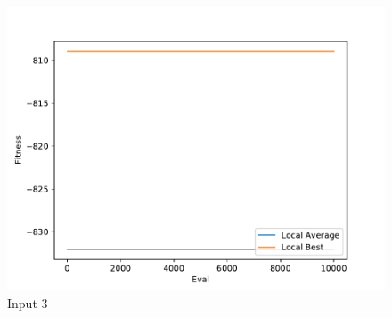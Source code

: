 \documentclass{standalone}
\begin{document}
\begin{figure}[!htb]
	\caption{Input 3}
	\label{fig:graph_3062}
	\includegraphics[width=\textwidth]{../graphs/graphs/3062.pdf}
\end{figure}
\end{document}
